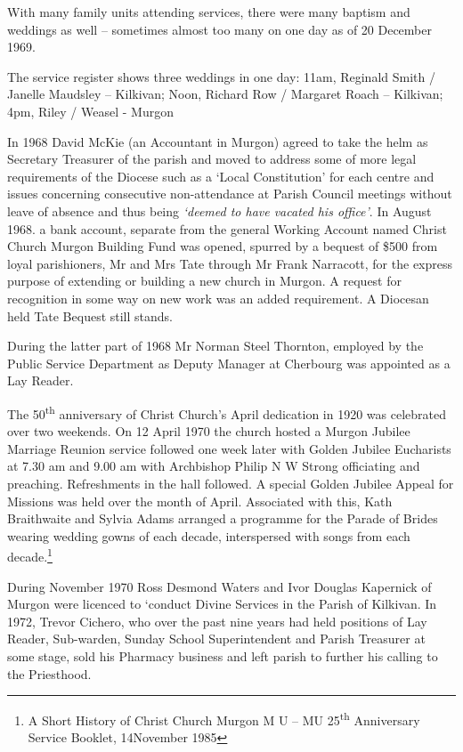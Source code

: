With many family units attending services, there were many baptism and weddings as well -- sometimes almost too many on one day as of 20 December 1969.



The service register shows three weddings in one day: 11am, Reginald Smith / Janelle Maudsley -- Kilkivan; Noon, Richard Row / Margaret Roach -- Kilkivan; 4pm, Riley / Weasel - Murgon



In 1968 David McKie (an Accountant in Murgon) agreed to take the helm as Secretary Treasurer of the parish and moved to address some of more legal requirements of the Diocese such as a `Local Constitution' for each centre and issues concerning consecutive non-attendance at Parish Council meetings without leave of absence and thus being \emph{`deemed to have vacated his office'}. In August 1968. a bank account, separate from the general Working Account named Christ Church Murgon Building Fund was opened, spurred by a bequest of \$500 from loyal parishioners, Mr and Mrs Tate through Mr Frank Narracott, for the express purpose of extending or building a new church in Murgon. A request for recognition in some way on new work was an added requirement. A Diocesan held Tate Bequest still stands.



During the latter part of 1968 Mr Norman Steel Thornton, employed by the Public Service Department as Deputy Manager at Cherbourg was appointed as a Lay Reader.



The 50\textsuperscript{th} anniversary of Christ Church's April dedication in 1920 was celebrated over two weekends. On 12 April 1970 the church hosted a Murgon Jubilee Marriage Reunion service followed one week later with Golden Jubilee Eucharists at 7.30 am and 9.00 am with Archbishop Philip N W Strong officiating and preaching. Refreshments in the hall followed. A special Golden Jubilee Appeal for Missions was held over the month of April. Associated with this, Kath Braithwaite and Sylvia Adams arranged a programme for the Parade of Brides wearing wedding gowns of each decade, interspersed with songs from each decade.\footnote{A Short History of Christ Church Murgon M U -- MU 25\textsuperscript{th} Anniversary Service Booklet, 14November 1985}


During November 1970 Ross Desmond Waters and Ivor Douglas Kapernick of Murgon were licenced to `conduct Divine Services in the Parish of Kilkivan. In 1972, Trevor Cichero, who over the past nine years had held positions of Lay Reader, Sub-warden, Sunday School Superintendent and Parish Treasurer at some stage, sold his Pharmacy business and left parish to further his calling to the Priesthood.



